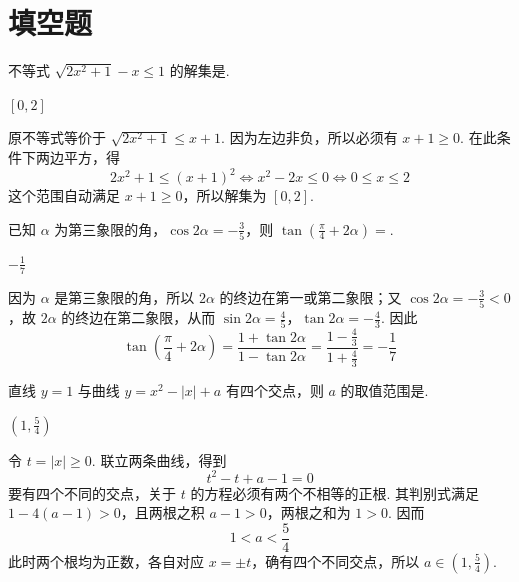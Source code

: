 \section{填空题}

\begin{problem}
不等式 \( \sqrt{2x^{2}+1}-x\leqslant1 \) 的解集是\fillinblank{}.
\end{problem}

\begin{answer}
\([0,2]\)
\end{answer}

\begin{solution}
原不等式等价于 \(\sqrt{2x^{2}+1}\leqslant x+1\). 因为左边非负，所以必须有 \(x+1\geqslant0\). 在此条件下两边平方，得
\[
2x^{2}+1\leqslant(x+1)^{2}
\Longleftrightarrow x^{2}-2x\leqslant0
\Longleftrightarrow 0\leqslant x\leqslant2
\]
这个范围自动满足 \(x+1\geqslant0\)，所以解集为 \([0,2]\).
\end{solution}

\begin{problem}
已知 \(\alpha\) 为第三象限的角，\(\cos 2\alpha = -\frac{3}{5}\)，则 \(\tan \left(\frac{\pi}{4} + 2\alpha\right) =\)\fillinblank{}.
\end{problem}

\begin{answer}
\(-\frac{1}{7}\)
\end{answer}

\begin{solution}
因为 \(\alpha\) 是第三象限的角，所以 \(2\alpha\) 的终边在第一或第二象限；又
\(\cos2\alpha=-\frac{3}{5}<0\)，故 \(2\alpha\) 的终边在第二象限，从而
\(\sin2\alpha=\frac{4}{5}\)，\(\tan2\alpha=-\frac{4}{3}\). 因此
\[
\tan\left(\frac{\pi}{4}+2\alpha\right)
=\frac{1+\tan2\alpha}{1-\tan2\alpha}
=\frac{1-\frac43}{1+\frac43}
=-\frac17
\]
\end{solution}

\begin{problem}
直线 \( y = 1 \) 与曲线 \( y = x^2 - |x| + a \) 有四个交点，则 \( a \) 的取值范围是\fillinblank{}.
\end{problem}

\begin{answer}
\(\left(1,\frac{5}{4}\right)\)
\end{answer}

\begin{solution}
令 \(t=|x|\geqslant0\). 联立两条曲线，得到
\[
t^{2}-t+a-1=0
\]
要有四个不同的交点，关于 \(t\) 的方程必须有两个不相等的正根. 其判别式满足
\(1-4(a-1)>0\)，且两根之积 \(a-1>0\)，两根之和为 \(1>0\). 因而
\[
1<a<\frac54
\]
此时两个根均为正数，各自对应 \(x=\pm t\)，确有四个不同交点，所以
\(a\in\left(1,\frac54\right)\).
\end{solution}

